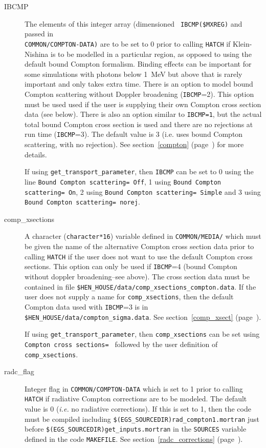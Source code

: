 \begin{description}
\item[IBCMP] The elements of this integer array (dimensioned {\tt
IBCMP(\$MXREG)} and passed in\\ {\tt COMMON/COMPTON-DATA)} are to be set to
0  prior to calling {\tt HATCH} if Klein-Nishina is to be modelled
in a particular region, as opposed to using the default bound Compton formalism.
Binding effects can be important for some simulations with photons below 1~MeV but
above that is rarely important and only takes extra time. There is an option
to model bound Compton scattering without Doppler broadening
({\tt IBCMP}=2).  This option must be used used if the user
is supplying their own Compton cross section data (see below).
There is also an option similar to {\tt IBCMP=1}, but the
actual total bound Compton cross section is used and there are
no rejections at run time ({\tt IBCMP}=3). The default
value is 3 (i.e. uses bound Compton scattering, with no rejection).
See section~\ref{compton} (page~\pageref{compton}) for more details.

If using {\tt get\_transport\_parameter}, then {\tt IBCMP} can be set to 0
using the line {\tt Bound Compton scattering= Off}, 1 using
{\tt Bound Compton scattering= On}, 2 using
{\tt Bound Compton scattering= Simple} and
3 using {\tt Bound Compton scattering= norej}.

\item[comp\_xsections] A character ({\tt character*16}) variable defined in
{\tt COMMON/MEDIA/} which must be given the name of the alternative
Compton cross section data prior to calling {\tt HATCH} if the user does
not want to use the default Compton cross sections.  This option can only
be used if {\tt IBCMP}=4 (bound Compton without doppler broadening--see above).
The cross section data must be contained in file
{\tt \$HEN\_HOUSE/data/comp\_xsections\_compton.data}.  If the user does
not supply a name for {\tt comp\_xsections}, then the default Compton
data used with {\tt IBCMP}=3 is in {\tt \$HEN\_HOUSE/data/compton\_sigma.data}.
See section~\ref{comp_xsect} (page~\pageref{comp_xsect}).

If using {\tt get\_transport\_parameter}, then {\tt comp\_xsections} can be
set using {\tt Compton cross sections= } followed by the user definition
of {\tt comp\_xsections}.

\item[radc\_flag] Integer flag in {\tt COMMON/COMPTON-DATA} which is set
to 1 prior to calling {\tt HATCH} if radiative Compton corrections are
to be modeled.  The default value is 0 ({\em i.e.} no radiative corrections).
If this is set to 1, then the code must be compiled including
{\tt \$(EGS\_SOURCEDIR)rad\_compton1.mortran} just before
{\tt \$(EGS\_SOURCEDIR)get\_inputs.mortran} in the {\tt SOURCES} variable
defined in the code {\tt MAKEFILE}.  See section~\ref{radc_corrections}
(page~\pageref{radc_corrections}).


\end{description}

